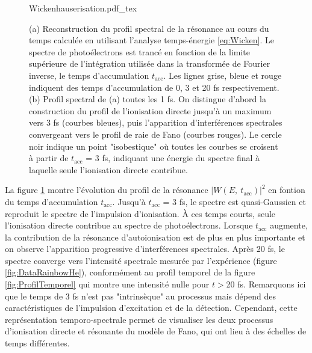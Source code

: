 \begin{figure}[!ht]
\centering
\def\svgwidth{1.2\textwidth}
{Wickenhauserisation.pdf_tex}
\caption{(a) Reconstruction du profil spectral de la résonance au cours du temps calculée en utilisant l'analyse temps-énergie \ref{eq:Wicken}. Le spectre de photoélectrons est trancé en fonction de la limite supérieure de l'intégration utilisée dans la transformée de Fourier inverse, le temps d'accumulation $t_{\text{acc}}$. Les lignes grise, bleue et rouge indiquent des temps d'accumulation de 0, 3 et 20 fs respectivement. (b) Profil spectral de (a) toutes les 1 fs. On distingue d'abord la construction du profil de l'ionisation directe jusqu'à un maximum vers 3 fs (courbes bleues), puis l'apparition d'interférences spectrales convergeant vers le profil de raie de Fano (courbes rouges). Le cercle noir indique un point "isobestique" où toutes les courbes se croisent à partir de $t_{\text{acc}}$ = 3 fs, indiquant une énergie du spectre final à laquelle seule l'ionisation directe contribue.} 
\label{fig:Wickenhauserisation}
\end{figure}

La figure \ref{fig:Wickenhauserisation} montre l'évolution du profil de la résonance $\left| W(E, \: t_{\text{acc}}) \right|^2$ en fontion du temps d'accumulation $t_{\text{acc}}$. Jusqu'à $t_{\text{acc}}$ = 3 fs, le spectre est quasi-Gaussien et reproduit le spectre de l'impulsion d'ionisation. \`{A} ces temps courts, seule l'ionisation directe contribue au spectre de photoélectrons. Lorsque $t_{\text{acc}}$ augmente, la contribution de la résonance d'autoionisation est de plus en plus importante et on observe l'apparition progressive d'interférences spectrales. Après 20 fs, le spectre converge vers l'intensité spectrale mesurée par l'expérience (figure \ref{fig:DataRainbowHe}), conformément au profil temporel de la figure \ref{fig:ProfilTemporel} qui montre une intensité nulle pour $t > $20 fs. Remarquons ici que le temps de 3 fs n'est pas "intrinsèque" au processus mais dépend des caractéristiques de l'impulsion d'excitation et de la détection. Cependant, cette représentation temporo-spectrale permet de visualiser les deux processus d'ionisation directe et résonante du modèle de Fano, qui ont lieu à des échelles de temps différentes. 

